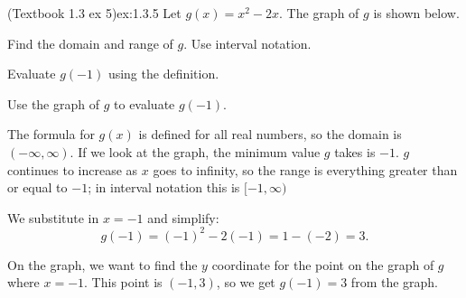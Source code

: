 \documentclass{article}
\begin{document}
\begin{example}{(Textbook 1.3 ex 5)}{ex:1.3.5}
    Let $g(x)=x^2-2x$. The graph of $g$ is shown below.
    \begin{problem}
        \item Find the domain and range of $g$. Use interval notation.
        \item Evaluate $g(-1)$ using the definition.
        \item Use the graph of $g$ to evaluate $g(-1)$.
    \end{problem}
    \begin{center}\end{center}
\end{example}
\begin{solution}
    \begin{problem}
        \item The formula for $g(x)$ is defined for all real numbers, so the domain is $(-\infty,\infty)$. If we look at the graph, the minimum value $g$ takes is $-1$. $g$ continues to increase as $x$ goes to infinity, so the range is everything greater than or equal to $-1$; in interval notation this is $[-1,\infty)$
        \item We substitute in $x=-1$ and simplify: \[g(-1)=(-1)^2-2(-1)=1-(-2)=3.\]
        \item On the graph, we want to find the $y$ coordinate for the point on the graph of $g$ where $x=-1$. This point is $(-1,3)$, so we get $g(-1)=3$ from the graph.
    \end{problem}
\end{solution}
\end{document}

